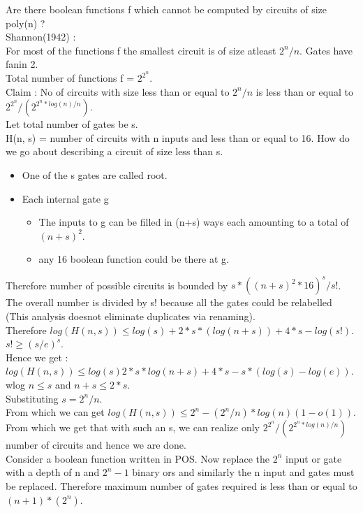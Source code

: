 \documentclass[solution,addpoints,12pt]{exam}
\begin{document}
Are there boolean functions f which cannot be computed by circuits
of size poly(n) ?\\
Shannon(1942) :\\
For most of the functions f the smallest circuit is of size
atleast $2^n/n$. Gates have fanin 2.\\
Total number of functions f = $2^{2^n}$.\\
Claim : No of circuits with size less than or equal to $2^n/n$
is less than or equal to $2^{2^n}/(2^{2^n*log(n)/n})$.\\
Let total number of gates be s.\\
H(n, s) = number of circuits with n inputs
and less than or equal to 16.
How do we go about describing a circuit of size less than s.\\
\begin{itemize}
\item One of the s gates are called root.
\item Each internal gate g
\begin{itemize}
\item The inputs to g can be filled in (n+s) ways
each amounting to a total of ${(n+s)}^2$.
\item any 16 boolean function could be there at g.
\end{itemize}
\end{itemize}
Therefore number of possible circuits is bounded by
$s*{({(n+s)}^2*16)}^s/s!$. The overall number is
divided by s! because all the gates could be relabelled (This
analysis doesnot eliminate duplicates via renaming).\\
Therefore $log(H(n, s)) \le log(s) + 2*s*(log(n+s)) + 4*s
- log(s!)$.\\
$s! \ge {(s/e)}^s$.\\
Hence we get :\\
$log(H(n, s)) \le log(s) 2*s*log(n+s) + 4*s - s*(log(s) - log(e))$.\\
wlog $n \le s$ and $n+s \le 2*s$.\\
Substituting $s = 2^n/n$.\\
From which we can get $log(H(n, s)) \le 2^n - (2^n/n)*log(n)(1 - o(1))$.\\
From which we get that with such an s, we can realize only
$2^{2^n}/(2^{2^n*log(n)/n})$ number of circuits and hence we are done.\\

Consider a boolean function written in POS. Now replace the
$2^n$ input or gate with a depth of n and $2^n-1$ binary ors
and similarly the n input and gates must be replaced. Therefore
maximum number of gates required is less than or equal to $(n+1)*(2^n)$.\\
\end{document}
